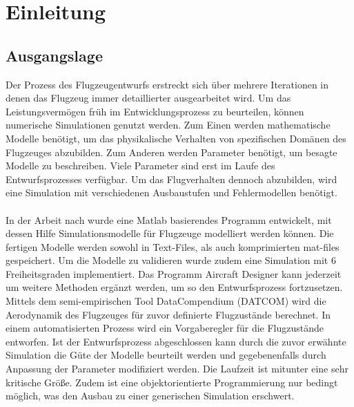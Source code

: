 \chapter{Einleitung}
\section{Ausgangslage}
\label{sec:ausgangslage}
Der Prozess des Flugzeugentwurfs erstreckt sich über mehrere Iterationen in denen das Flugzeug immer detaillierter ausgearbeitet wird. Um das Leistungsvermögen früh im Entwicklungsprozess zu beurteilen, können numerische Simulationen genutzt werden. Zum Einen werden mathematische Modelle benötigt, um das physikalische Verhalten von spezifischen Domänen des Flugzeuges abzubilden. Zum Anderen werden Parameter benötigt, um besagte Modelle zu beschreiben. Viele Parameter sind erst im Laufe des Entwurfsprozesses verfügbar. Um das Flugverhalten dennoch abzubilden, wird eine Simulation mit verschiedenen Ausbaustufen und Fehlermodellen benötigt.\\\\
In der Arbeit nach  \cite{Olucak.15.02.2017} wurde eine Matlab basierendes Programm entwickelt, mit dessen Hilfe Simulationsmodelle für Flugzeuge modelliert werden können. Die fertigen Modelle werden sowohl in Text-Files, als auch komprimierten mat-files gespeichert. Um die Modelle zu validieren wurde zudem eine Simulation mit 6 Freiheitsgraden implementiert. Das Programm Aircraft Designer kann jederzeit um weitere Methoden ergänzt werden, um so den Entwurfsprozess fortzusetzen. Mittels dem semi-empirischen Tool DataCompendium (DATCOM) wird die Aerodynamik des Flugzeuges für zuvor definierte Flugzustände berechnet. In einem automatisierten Prozess wird ein Vorgaberegler für die Flugzustände entworfen. Ist der Entwurfsprozess abgeschlossen kann durch die zuvor erwähnte Simulation die Güte der Modelle beurteilt werden und gegebenenfalls durch Anpassung der Parameter modifiziert werden. Die Laufzeit ist mitunter eine sehr kritische Größe. Zudem ist eine objektorientierte Programmierung nur bedingt möglich, was den Ausbau zu einer generischen Simulation erschwert.
\newpage
